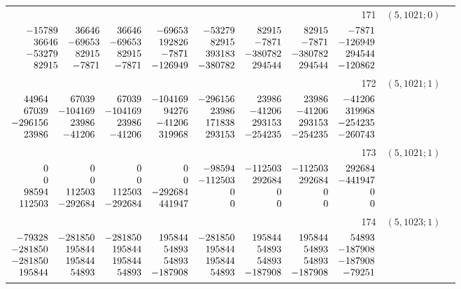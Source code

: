 \documentclass[11pt]{article}
\theoremstyle{remark}
\numberwithin{equation}{section}
\begin{document}
\begin{longtable}{rcl}
171 & $(5,1021;0)$ & \begin{tabular}[t]{@{}l@{}}$w_i=\displaystyle \frac{500668015173637}{20129120541810000000000000000000000}$\\[3pt]{\scriptsize$\begin{array}{@{}rrrrrrrr@{}}-15789 & 36646 & 36646 & -69653 & -53279 & 82915 & 82915 & -7871\\36646 & -69653 & -69653 & 192826 & 82915 & -7871 & -7871 & -126949\\-53279 & 82915 & 82915 & -7871 & 393183 & -380782 & -380782 & 294544\\82915 & -7871 & -7871 & -126949 & -380782 & 294544 & 294544 & -120862\end{array}$}\end{tabular}\\[8pt]
172 & $(5,1021;1)$ & \begin{tabular}[t]{@{}l@{}}$w_i=\displaystyle \frac{46617596546400257}{23904832437939375000000000000000000}$\\[3pt]{\scriptsize$\begin{array}{@{}rrrrrrrr@{}}44964 & 67039 & 67039 & -104169 & -296156 & 23986 & 23986 & -41206\\67039 & -104169 & -104169 & 94276 & 23986 & -41206 & -41206 & 319968\\-296156 & 23986 & 23986 & -41206 & 171838 & 293153 & 293153 & -254235\\23986 & -41206 & -41206 & 319968 & 293153 & -254235 & -254235 & -260743\end{array}$}\end{tabular}\\[8pt]
173 & $(5,1021;1)$ & \begin{tabular}[t]{@{}l@{}}$w_i=\displaystyle \frac{5156467371309277}{3991895441611333593750000000000000}$\\[3pt]{\scriptsize$\begin{array}{@{}rrrrrrrr@{}}0 & 0 & 0 & 0 & -98594 & -112503 & -112503 & 292684\\0 & 0 & 0 & 0 & -112503 & 292684 & 292684 & -441947\\98594 & 112503 & 112503 & -292684 & 0 & 0 & 0 & 0\\112503 & -292684 & -292684 & 441947 & 0 & 0 & 0 & 0\end{array}$}\end{tabular}\\[8pt]
174 & $(5,1023;1)$ & \begin{tabular}[t]{@{}l@{}}$w_i=\displaystyle \frac{32537947759658797}{169761371750002687500000000000000000}$\\[3pt]{\scriptsize$\begin{array}{@{}rrrrrrrr@{}}-79328 & -281850 & -281850 & 195844 & -281850 & 195844 & 195844 & 54893\\-281850 & 195844 & 195844 & 54893 & 195844 & 54893 & 54893 & -187908\\-281850 & 195844 & 195844 & 54893 & 195844 & 54893 & 54893 & -187908\\195844 & 54893 & 54893 & -187908 & 54893 & -187908 & -187908 & -79251\end{array}$}\end{tabular}\\[8pt]

\end{longtable}
\end{document}
